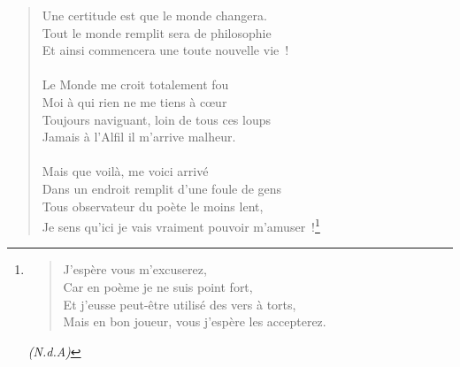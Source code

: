 {{\begin{verse}
Une certitude est que le monde changera. \\
Tout le monde remplit sera de philosophie \\
Et ainsi commencera une toute nouvelle vie~! \\
~\\
Le Monde me croit totalement fou \\
Moi à qui rien ne me tiens à cœur \\
Toujours naviguant, loin de tous ces loups \\
Jamais à l’Alfil il m’arrive malheur. \\
~\\
Mais que voilà, me voici arrivé \\
Dans un endroit remplit d’une foule de gens \\
Tous observateur du poète le moins lent, \\
Je sens qu’ici je vais vraiment pouvoir m’amuser~!\footnote{
\begin{verse}
J’espère vous m’excuserez, \\
Car en poème je ne suis point fort, \\
Et j’eusse peut-être utilisé des vers à torts, \\
Mais en bon joueur, vous j’espère les accepterez.
\end{verse}
\textit{(N.d.A)}
}
\end{verse}
}

}

